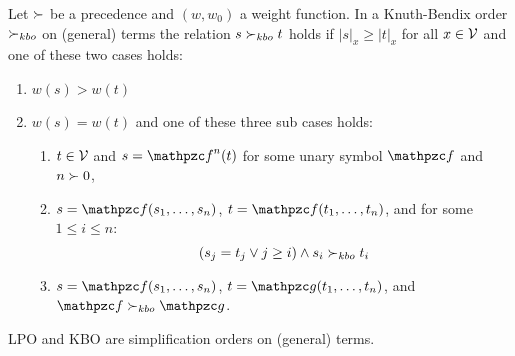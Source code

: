 \begin{definition}[KBO]\label{def:kbo}
	Let $\succ$ be a precedence and $(w,w_0)$ a weight function.
	In a Knuth-Bendix order $\succ_{kbo}$ on (general) terms the relation $s\succ_{kbo} t$ holds if
	$|s|_x\geq|t|_x$ for all $x\in{\mathcal V}$ and one of these two cases holds:
	\begin{enumerate}
		\item $w(s) > w(t)$
		\item $w(s) = w(t)$ and one of these three sub cases holds:
		\begin{enumerate}
			\item $t\in{\mathcal V}$ and $s=\mcf^n(t)$ for some unary symbol $\mcf$ and $n\succ0$,
			\item $s=\mcf(s_1,\ldots,s_n)$, $t=\mcf(t_1,\ldots,t_n)$, and for some $1\leq i\leq n$:
			\[
			(s_j=t_j \lor j\geq i) \land s_i\succ_{kbo} t_i
			\]
			\item $s=\mcf(s_1,\ldots,s_n)$, $t=\mcg(t_1,\ldots,t_n)$, and $\mcf\gtpre_{kbo}\mcg$.
		\end{enumerate}
	\end{enumerate}
\end{definition}

\begin{lemma}
	LPO and KBO are simplification orders on (general) terms.
\end{lemma}
